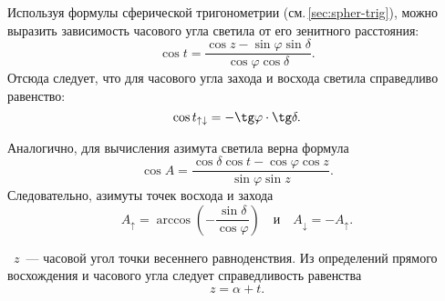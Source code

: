 Используя формулы сферической тригонометрии (см.\,\ref{sec:spher-trig}), можно выразить зависимость часового угла светила от его зенитного расстояния:
\begin{equation}
	\cos t=\frac{\cos z-\sin\varphi\sin\delta}{\cos\varphi\cos\delta}.
\end{equation}
Отсюда следует, что для часового угла захода и восхода светила справедливо равенство:
\begin{equation}
	\cos t_{\uparrow\downarrow}=-\tg\varphi\cdot\tg\delta.
\end{equation}

Аналогично, для вычисления азимута светила верна формула
\begin{equation}
	\cos A=\frac{\cos\delta\cos t-\cos\varphi\cos z}{\sin\varphi\sin z}.
\end{equation}
Следовательно, азимуты точек восхода и захода
\begin{equation}
	A_\uparrow = \arccos \left(-\dfrac{\sin\delta}{\cos \varphi} \right)\quad\text{и}\quad A_\downarrow = - A_\uparrow.
\end{equation}

~$z$~--- часовой угол точки весеннего равноденствия. Из определений прямого восхождения и часового угла следует справедливость равенства\begin{equation}
z = \alpha + t.
\end{equation}
